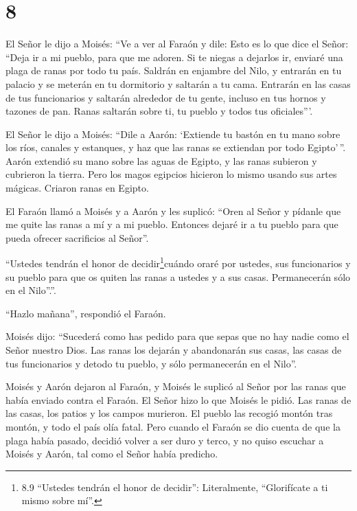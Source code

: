 \hypertarget{section-7}{%
\section{8}\label{section-7}}

 El Señor le dijo a Moisés: ``Ve a ver al Faraón y dile:
Esto es lo que dice el Señor: ``Deja ir a mi pueblo, para que me adoren.
 Si te niegas a dejarlos ir, enviaré una plaga de ranas por
todo tu país.  Saldrán en enjambre del Nilo, y entrarán en
tu palacio y se meterán en tu dormitorio y saltarán a tu cama. Entrarán
en las casas de tus funcionarios y saltarán alrededor de tu gente,
incluso en tus hornos y tazones de pan.  Ranas saltarán
sobre ti, tu pueblo y todos tus oficiales'''.

 El Señor le dijo a Moisés: ``Dile a Aarón: `Extiende tu
bastón en tu mano sobre los ríos, canales y estanques, y haz que las
ranas se extiendan por todo Egipto'\,''.  Aarón extendió su
mano sobre las aguas de Egipto, y las ranas subieron y cubrieron la
tierra.  Pero los magos egipcios hicieron lo mismo usando
sus artes mágicas. Criaron ranas en Egipto.

 El Faraón llamó a Moisés y a Aarón y les suplicó: ``Oren al
Señor y pídanle que me quite las ranas a mí y a mi pueblo. Entonces
dejaré ir a tu pueblo para que pueda ofrecer sacrificios al Señor''.

 ``Ustedes tendrán el honor de decidir\footnote{8.9
  ``Ustedes tendrán el honor de decidir'': Literalmente, ``Glorifícate a
  ti mismo sobre mí''.}cuándo oraré por ustedes, sus funcionarios y su
pueblo para que os quiten las ranas a ustedes y a sus casas.
Permanecerán sólo en el Nilo''.''.

 ``Hazlo mañana'', respondió el Faraón.

Moisés dijo: ``Sucederá como has pedido para que sepas que no hay nadie
como el Señor nuestro Dios.  Las ranas los dejarán y
abandonarán sus casas, las casas de tus funcionarios y detodo tu pueblo,
y sólo permanecerán en el Nilo''.

 Moisés y Aarón dejaron al Faraón, y Moisés le suplicó al
Señor por las ranas que había enviado contra el Faraón.  El
Señor hizo lo que Moisés le pidió. Las ranas de las casas, los patios y
los campos murieron.  El pueblo las recogió montón tras
montón, y todo el país olía fatal.  Pero cuando el Faraón
se dio cuenta de que la plaga había pasado, decidió volver a ser duro y
terco, y no quiso escuchar a Moisés y Aarón, tal como el Señor había
predicho.

